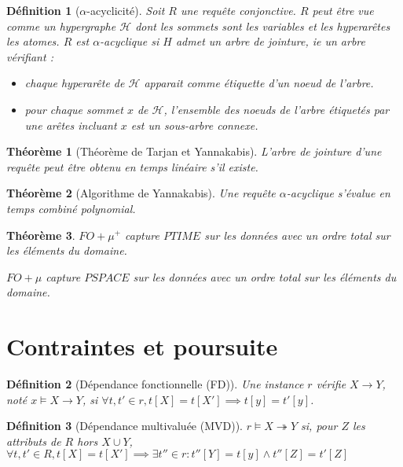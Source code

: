 \documentclass[landscape]{article}
\renewcommand{\H}{\mathscr{H}}
\newcommand{\1}{\mathbbm{1}}
\newcommand{\0}{\mathbbm{0}}
\newtheorem{theo}{Théorème}
\newtheorem{defi}{Définition}
\begin{document}
\begin{multicols}{2}
    \begin{defi}[$\alpha$-acyclicité]
        Soit $R$ une requête conjonctive. $R$ peut être vue comme un hypergraphe $\H$
        dont les sommets sont les variables et les hyperarêtes les atomes. $R$ est
        $\alpha$-acyclique si $H$ admet un arbre de jointure, ie un arbre vérifiant :
        \begin{itemize}
            \item chaque hyperarête de $\H$ apparait comme étiquette d'un noeud de l'arbre.
            \item pour chaque sommet $x$ de $\H$, l'ensemble des noeuds de l'arbre étiquetés
                par une arêtes incluant $x$ est un sous-arbre connexe.
        \end{itemize}
    \end{defi}

    \begin{theo}[Théorème de Tarjan et Yannakabis]
        L'arbre de jointure d'une requête peut être obtenu en temps linéaire
        s'il existe.
    \end{theo}

    \begin{theo}[Algorithme de Yannakabis]
        Une requête $\alpha$-acyclique s'évalue en temps combiné polynomial.
    \end{theo}

    \begin{theo} $FO+\mu^+$ capture $PTIME$ sur les données avec un ordre total sur
        les éléments du domaine.
        
        $FO+\mu$ capture $PSPACE$ sur les données avec un ordre total sur les éléments
        du domaine.
    \end{theo}

    \section{Contraintes et poursuite}

    \begin{defi}[Dépendance fonctionnelle (FD)]
        Une instance $r$ vérifie $X\rightarrow Y$, noté $x\models X\rightarrow Y$,
        si $\forall t, t'\in r, t[X] = t[X']\implies t[y] = t'[y]$.
    \end{defi}

    \begin{defi}[Dépendance multivaluée (MVD)]
        $r\models X\twoheadrightarrow Y$ si, pour $Z$ les attributs de $R$ hors
        $X\cup Y$, $\forall t, t'\in R, t[X] = t[X'] \implies \exists t''\in r:
        t''[Y] = t[y] \wedge t''[Z] = t'[Z]$
    \end{defi}


\end{multicols}
\end{document}
